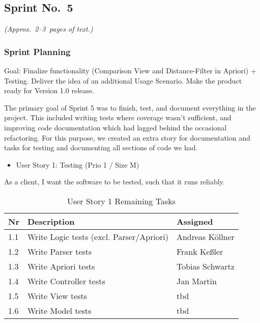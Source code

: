 
\subsection{Sprint No.~5}

\emph{(Approx.~2--3~pages of text.)}

\subsubsection*{Sprint Planning}

Goal: Finalize functionality (Comparison View and Distance-Filter in Apriori) + Testing.
Deliver the idea of an additional Usage Scenario.
Make the product ready for Version 1.0 release.

The primary goal of Sprint 5 was to finish, test, and document everything in the project. This included writing tests where coverage wasn't sufficient, and improving code documentation which had lagged behind the occasional refactoring. For this purpose, we created an extra story for documentation and tasks for testing and documenting all sections of code we had.

\begin{itemize}
	\item User Story 1: Testing (Prio 1 / Size M)
	\end{itemize}
As a client,
I want the software to be tested,
such that it runs reliably.
\begin{table}[h]
  \caption{User Story 1 Remaining Tasks}
  \label{Story 1 Tasks}
  \centering
  \begin{tabular}{p{1cm}|p{5cm}|p{3cm}|}
  	Nr & Description & Assigned \\ 
  	\hline
  	1.1 & Write Logic tests (excl. Parser/Apriori) & Andreas Köllner \\ 
  	\hline
  	1.2 & Write Parser tests & Frank Keßler \\ 
  	\hline
  	1.3 & Write Apriori tests & Tobias Schwartz \\ 
  	\hline
  	1.4 & Write Controller tests &  Jan Martin \\ 
  	\hline
  	1.5 & Write View tests &  tbd \\ 
  	\hline
  	1.6 & Write Model tests &  tbd \\ 
  	\hline
  \end{tabular}
\end{table}

